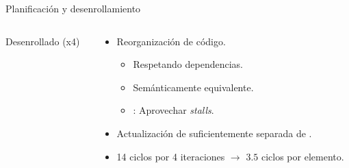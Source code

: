 \begin{frame}[t]{Planificación y desenrollamiento}

\begin{columns}

\begin{column}{.45\textwidth}
\begin{block}{Desenrollado (x4)}

\end{block}
\end{column}

\begin{column}{.45\textwidth}
\begin{itemize}
  \item Reorganización de código.
    \begin{itemize}
      \item Respetando dependencias.
      \item Semánticamente equivalente.
      \item {}: Aprovechar \emph{stalls}.
    \end{itemize}
  \item Actualización de  suficientemente separada de
        .
  \item 14 ciclos por 4 iteraciones $\rightarrow$ $3.5$ ciclos por elemento.
\end{itemize}
\end{column}

\end{columns}

\end{frame}

